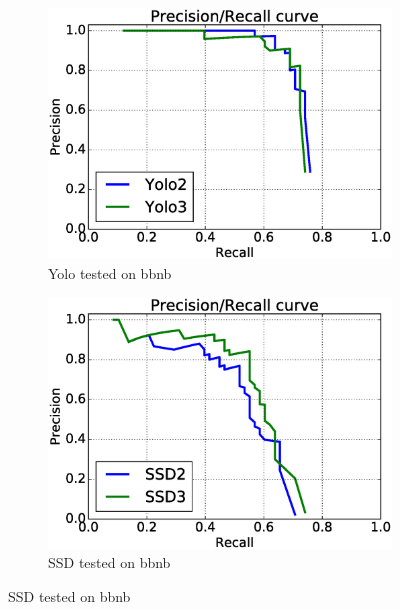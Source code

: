 \begin{figure}[h!]
\begin{subfigure}{.5\textwidth}
  \centering
  \includegraphics[width=0.8\linewidth]{results/case_buildings/prec_recall/yolo/bb.eps}
  \caption{Yolo tested on bbnb}
  \label{fig:sfig1}
\end{subfigure}%
\begin{subfigure}{.5\textwidth}
  \centering
  \includegraphics[width=.8\linewidth]{results/case_buildings/prec_recall/ssd/bb.eps}
  \caption{SSD tested on bbnb}
  \label{fig:sfig2}
\end{subfigure}


\end{figure}
